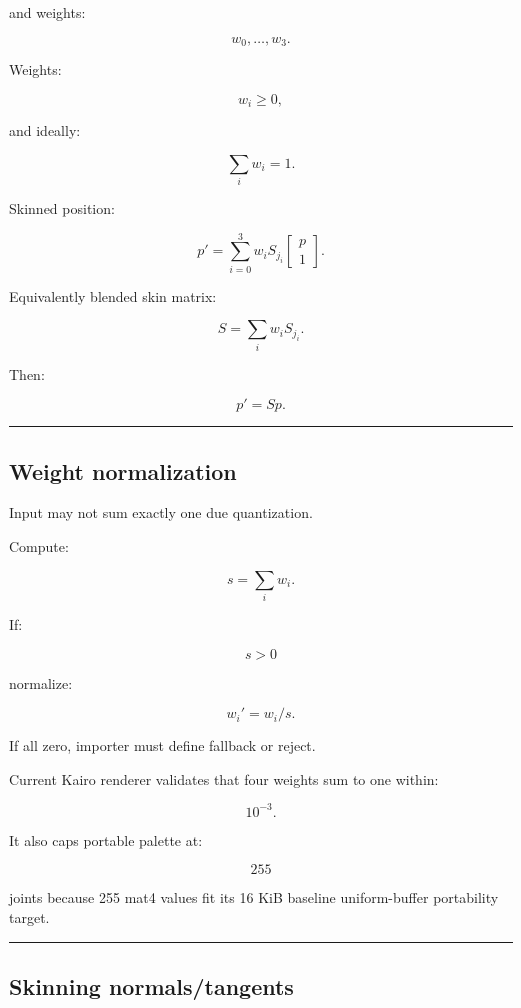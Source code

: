 and weights:

\[
w_0,\dots,w_3.
\]

Weights:

\[
w_i\ge0,
\]

and ideally:

\[
\boxed{
\sum_iw_i=1.
}
\]

Skinned position:

\[
\boxed{
p'
=
\sum_{i=0}^{3}
w_i
S_{j_i}
\begin{bmatrix}
p\\1
\end{bmatrix}.
}
\]

Equivalently blended skin matrix:

\[
S=
\sum_iw_iS_{j_i}.
\]

Then:

\[
p'=Sp.
\]

\begin{center}\rule{0.5\linewidth}{0.5pt}\end{center}

\subsection{Weight normalization}\label{04-visual-computing-ii-ch041-weight-normalization}

\hypertarget{04-visual-computing-ii-ch041-weight-normalization}{}

Input may not sum exactly one due quantization.

Compute:

\[
s=
\sum_iw_i.
\]

If:

\[
s>0
\]

normalize:

\[
w_i'=w_i/s.
\]

If all zero, importer must define fallback or reject.

Current Kairo renderer validates that four weights sum to one within:

\[
10^{-3}.
\]

It also caps portable palette at:

\[
255
\]

joints because 255 mat4 values fit its 16 KiB baseline uniform-buffer portability target.

\begin{center}\rule{0.5\linewidth}{0.5pt}\end{center}

\subsection{Skinning normals/tangents}\label{04-visual-computing-ii-ch041-skinning-normalstangents}

